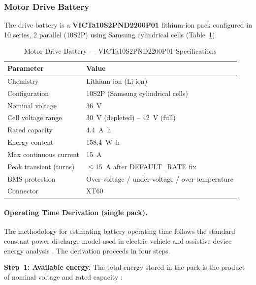 \documentclass[12pt,a4paper]{report}
\begin{document}
\subsubsection{Motor Drive Battery}
\label{subsec:motor_battery_impl}

The drive battery is a \textbf{VICTa10S2PND2200P01} lithium-ion pack configured
in 10 series, 2 parallel (10S2P) using Samsung cylindrical cells
(Table~\ref{tab:motor_battery_impl}).

\begin{table}[H]
\centering
\caption{Motor Drive Battery — VICTa10S2PND2200P01 Specifications}
\label{tab:motor_battery_impl}
\begin{tabular}{@{}p{5.5cm} p{6.5cm}@{}}
\toprule
\rowcolor{rafblue!20}
\textbf{Parameter} & \textbf{Value} \\
\midrule
Chemistry               & Lithium-ion (Li-ion) \\
Configuration           & 10S2P (Samsung cylindrical cells) \\
Nominal voltage         & \SI{36}{\volt} \\
Cell voltage range      & \SI{30}{\volt} (depleted) – \SI{42}{\volt} (full) \\
Rated capacity          & \SI{4.4}{\ampere\hour} \\
Energy content          & \SI{158.4}{\watt\hour} \\
Max continuous current  & \SI{15}{\ampere} \\
Peak transient (turns)  & $\leq$\SI{15}{\ampere} after DEFAULT\_RATE fix \\
BMS protection          & Over-voltage / under-voltage / over-temperature \\
Connector               & XT60 \\
\bottomrule
\end{tabular}
\end{table}

\paragraph{Operating Time Derivation (single pack).}

The methodology for estimating battery operating time follows the
standard constant-power discharge model used in electric vehicle and
assistive-device energy analysis \cite{linden2011handbook,
andrea2010battery}. The derivation proceeds in four steps.

\medskip
\noindent\textbf{Step~1: Available energy.}
The total energy stored in the pack is the product of nominal voltage
and rated capacity \cite{linden2011handbook}:
\end{document}
